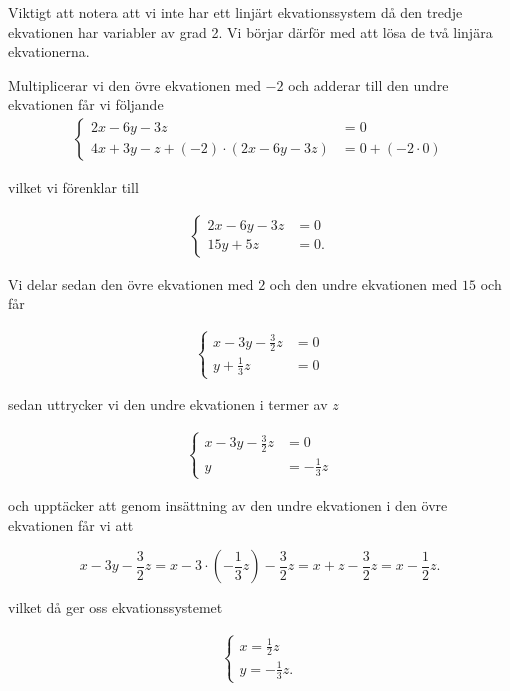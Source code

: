 \documentclass[../../main.tex]{subfiles}
\begin{document}
\begin{solution}{5}
Viktigt att notera att vi inte har ett linjärt ekvationssystem då den tredje ekvationen har variabler av grad 2. Vi börjar därför med att lösa de två linjära ekvationerna.

\bigskip

Multiplicerar vi den övre ekvationen med $-2$ och adderar till den undre ekvationen får vi följande
\begin{align*}
    \begin{cases} 
     2x-6y-3z&=0  \\
    4x+3y-z+(-2)\cdot(2x-6y-3z)&=0 + (-2\cdot0) 
    \end{cases}
\end{align*}

vilket vi förenklar till

\begin{align*}
    \begin{cases} 
     2x-6y-3z&=0  \\
    15y+5z&=0. 
    \end{cases}
\end{align*}

Vi delar sedan den övre ekvationen med $2$ och den undre ekvationen med $15$ och får

\begin{align*}
    \begin{cases} 
     x-3y-\frac{3}{2}z&=0  \\
    y+\frac{1}{3}z&=0 
    \end{cases}
\end{align*}

sedan uttrycker vi den undre ekvationen i termer av $z$

\begin{align*}
    \begin{cases} 
     x-3y-\frac{3}{2}z&=0  \\
    y&=-\frac{1}{3}z 
    \end{cases}
\end{align*}

och upptäcker att genom insättning av den undre ekvationen i den övre ekvationen får vi att

$$x-3y-\frac{3}{2}z=x-3\cdot(-\frac{1}{3}z) -\frac{3}{2}z=x+z-\frac{3}{2}z=x-\frac{1}{2}z.$$

vilket då ger oss ekvationssystemet 

\begin{align*}
    \begin{cases} 
     x=\frac{1}{2}z\\
    y=-\frac{1}{3}z.
    \end{cases}
\end{align*}


\end{solution}
\end{document}
